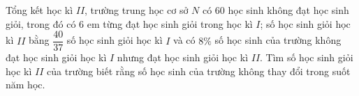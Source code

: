 \begin{bt}%
	Tổng kết học kì $II$, trường trung học cơ sở $N$ có $60$ học sinh không đạt học sinh giỏi, trong đó có $6$ em từng đạt học sinh giỏi trong học kì $I$; số học sinh giỏi học kì $II$ bằng $\dfrac{40}{37}$ số học sinh giỏi học kì $I$ và có $8\%$ số
	học sinh của trường không đạt học sinh giỏi học kì $I$ nhưng đạt học sinh giỏi học kì $II$. Tìm số học sinh giỏi học kì $II$ của trường biết rằng số học sinh của trường không thay đổi trong suốt năm học.
\end{bt}

